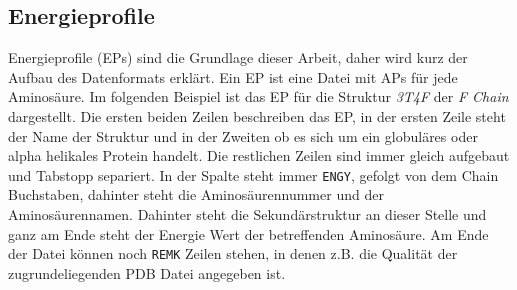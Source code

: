 \subsection{Energieprofile}
\label{sec:Energieprofil}
Energieprofile (EPs) sind die Grundlage dieser Arbeit, daher wird kurz der Aufbau des Datenformats erklärt. Ein \ac{EP} ist eine Datei mit \ac{APs} für jede Aminosäure. Im folgenden Beispiel ist das EP für die Struktur \emph{3T4F} der \emph{F Chain} dargestellt. Die ersten beiden Zeilen beschreiben das \ac{EP}, in der ersten Zeile steht der Name der Struktur und in der Zweiten ob es sich um ein globuläres oder alpha helikales Protein handelt. Die restlichen Zeilen sind immer gleich aufgebaut und Tabstopp separiert. In der Spalte steht immer \texttt{ENGY}, gefolgt von dem Chain Buchstaben, dahinter steht die Aminosäurennummer und der Aminosäurennamen. Dahinter steht die Sekundärstruktur an dieser Stelle und ganz am Ende steht der Energie Wert der betreffenden Aminosäure. Am Ende der Datei können noch \texttt{REMK} Zeilen stehen, in denen z.B. die Qualität der zugrundeliegenden \ac{PDB} Datei angegeben ist.

